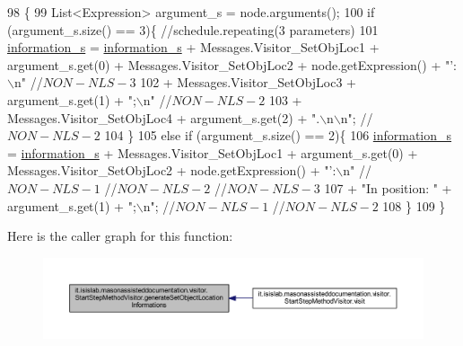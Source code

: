 \begin{DoxyCode}
98                                                                               \{
99         List<Expression> argument\_s = node.arguments();
100         \textcolor{keywordflow}{if} (argument\_s.size() == 3)\{    \textcolor{comment}{//schedule.repeating(3 parameters)}
101             \hyperlink{classit_1_1isislab_1_1masonassisteddocumentation_1_1visitor_1_1_code_visitor_a628ab846d2f4de647f171060ebe73774}{information\_s} = \hyperlink{classit_1_1isislab_1_1masonassisteddocumentation_1_1visitor_1_1_code_visitor_a628ab846d2f4de647f171060ebe73774}{information\_s} + Messages.Visitor\_SetObjLoc1 + 
      argument\_s.get(0) + Messages.Visitor\_SetObjLoc2 + node.getExpression() + \textcolor{stringliteral}{"': \(\backslash\)n"} \textcolor{comment}{//$NON-NLS-3$}
102                                 + Messages.Visitor\_SetObjLoc3 + argument\_s.get(1) + \textcolor{stringliteral}{";\(\backslash\)n"} \textcolor{comment}{//$NON-NLS-2$}
103                                 + Messages.Visitor\_SetObjLoc4 + argument\_s.get(2) + \textcolor{stringliteral}{".\(\backslash\)n\(\backslash\)n"}; \textcolor{comment}{//$NON-NLS-2$}
104         \}
105         \textcolor{keywordflow}{else} \textcolor{keywordflow}{if} (argument\_s.size() == 2)\{
106             \hyperlink{classit_1_1isislab_1_1masonassisteddocumentation_1_1visitor_1_1_code_visitor_a628ab846d2f4de647f171060ebe73774}{information\_s} = \hyperlink{classit_1_1isislab_1_1masonassisteddocumentation_1_1visitor_1_1_code_visitor_a628ab846d2f4de647f171060ebe73774}{information\_s} + Messages.Visitor\_SetObjLoc1 + 
      argument\_s.get(0) + Messages.Visitor\_SetObjLoc2 + node.getExpression() + \textcolor{stringliteral}{"':\(\backslash\)n"} \textcolor{comment}{//$NON-NLS-1$ //$NON-NLS-2$
       //$NON-NLS-3$}
107                     + \textcolor{stringliteral}{"In position: "} + argument\_s.get(1) + \textcolor{stringliteral}{";\(\backslash\)n"}; \textcolor{comment}{//$NON-NLS-1$ //$NON-NLS-2$}
108         \}
109     \}
\end{DoxyCode}


Here is the caller graph for this function\-:\nopagebreak
\begin{figure}[H]
\begin{center}
\leavevmode
\includegraphics[width=350pt]{classit_1_1isislab_1_1masonassisteddocumentation_1_1visitor_1_1_start_step_method_visitor_a737cae4933895eb73a56e06059cb3edf_icgraph}
\end{center}
\end{figure}


